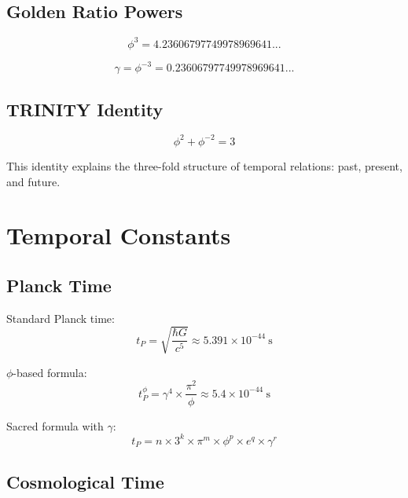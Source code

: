 \documentclass[12pt,a4paper]{article}
\begin{document}
\subsection{Golden Ratio Powers}

\begin{equation}
\phi^3 = 4.23606797749978969641...
\end{equation}

\begin{equation}
\gamma = \phi^{-3} = 0.23606797749978969641...
\end{equation}

\subsection{TRINITY Identity}

\begin{equation}
\phi^2 + \phi^{-2} = 3
\end{equation}

This identity explains the three-fold structure of temporal relations: past, present, and future.

\section{Temporal Constants}

\subsection{Planck Time}

Standard Planck time:
\begin{equation}
t_P = \sqrt{\frac{\hbar G}{c^5}} \approx 5.391 \times 10^{-44}~\text{s}
\end{equation}

$\phi$-based formula:
\begin{equation}
t_P^\phi = \gamma^4 \times \frac{\pi^2}{\phi} \approx 5.4 \times 10^{-44}~\text{s}
\end{equation}

Sacred formula with $\gamma$:
\begin{equation}
t_P = n \times 3^k \times \pi^m \times \phi^p \times e^q \times \gamma^r
\end{equation}

\subsection{Cosmological Time}
\end{document}
